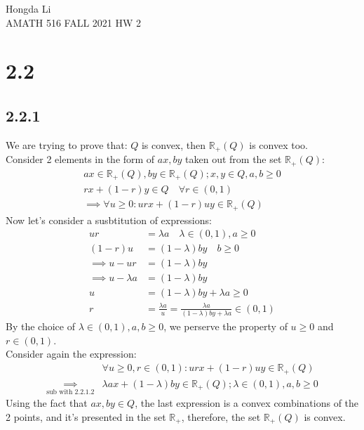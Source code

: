 \documentclass[]{article}
\begin{document}
\begin{center}
    Hongda Li
    \\
    AMATH 516 FALL 2021 HW 2
\end{center}
\section*{2.2}
    \subsection*{2.2.1}
        We are trying to prove that: $Q$ is convex, then $\mathbb{R}_+(Q)$ is convex too. 
        \\[1.1em]
        Consider 2 elements in the form of $ax, by$ taken out from the set $\mathbb{R}_+(Q)$: 
        \begin{align*}\tag{2.2.1.1}\label{eqn:2.2.1.1}
            ax\in \mathbb{R}_+(Q), by \in \mathbb{R}_+(Q); x, y \in Q, a,b \ge 0
            \\
            rx + (1 - r)y \in Q \quad \forall r \in (0, 1)
            \\
            \implies \forall u \ge 0: urx + (1 - r)uy \in \mathbb{R}_+(Q)
        \end{align*}
        Now let's consider a susbtitution of expressions: 
        \begin{align*}\tag{2.2.1.2}\label{eqn:2.2.1.2}
            ur &= \lambda a \quad \lambda \in (0, 1), a \ge 0
            \\
            (1 - r)u &= (1 - \lambda) by \quad b \ge 0 
            \\
            \implies
            u - ur &= (1 - \lambda) by 
            \\\implies 
            u - \lambda a &= (1 - \lambda)by
            \\
            u &= (1 - \lambda)by + \lambda a \ge 0 
            \\
            r &= \frac{\lambda a}{u} = \frac{\lambda a }{(1 - \lambda)by + \lambda a} \in (0, 1)
        \end{align*}
        By the choice of $\lambda \in (0, 1), a,b \ge 0$, we perserve the property of $u \ge 0$ and $r \in (0, 1)$. 
        \\
        Consider again the expression: 
        \begin{align*}\tag{2.2.1.3}\label{eqn:2.2.1.3}
            & \forall u\ge 0,r\in (0, 1)  : urx + (1 - r)uy \in \mathbb{R}_+(Q)
            \\
            \underset{ \text{sub with } \hyperref[eqn:2.2.1.2]{2.2.1.2}}{\implies}
            & \lambda a x + (1 - \lambda)by \in \mathbb{R}_+(Q); \lambda\in (0, 1), a,b \ge 0 
        \end{align*}
        Using the fact that $ax, by\in Q$, the last expression is a convex combinations of the 2 points, and it's presented in the set $\mathbb{R}_+$, therefore, the set $\mathbb{R}_+(Q)$ is convex. 
\end{document}
